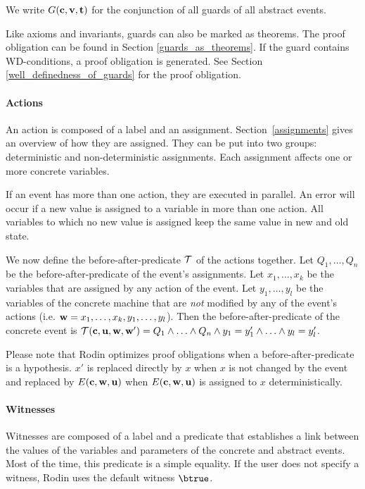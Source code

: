 We write $G(\mathbf{c},\mathbf{v},\mathbf{t})$ for the conjunction of all guards of all abstract events.

Like axioms and invariants, guards can also be marked as theorems. 
The proof obligation can be found in Section \ref{guards_as_theorems}.
If the guard contains WD-conditions, a proof obligation is generated.
See Section \ref{well_definedness_of_guards} for the proof obligation.

\paragraph{Actions}
\label{actions}
An action is composed of a label and an assignment.
Section~\ref{assignments} gives an overview of how they are assigned.
They can be put into two groups: deterministic and non-deterministic assignments.
Each assignment affects one or more concrete variables.

If an event has more than one action, they are executed in parallel. 
An error will occur if a new value is assigned to a variable in more than one action.
All variables to which no new value is assigned keep the same value in new and old state.

We now define the before-after-predicate $\mathcal{T}$ of the actions together.
Let $Q_1,\ldots,Q_n$ be the before-after-predicate of the event's assignments. 
Let $x_1,\ldots,x_k$ be the variables that are assigned by any action of the event.
Let $y_1,\ldots,y_l$ be the variables of the concrete machine that are \emph{not} modified by any of 
 the event's actions (i.e. $\mathbf{w} = x_1,\ldots,x_k,y_1,\ldots,y_l$).
Then the before-after-predicate of the concrete event is 
  $\mathcal{T}(\mathbf{c},\mathbf{u},\mathbf{w},\mathbf{w}') = Q_1 \land \ldots \land Q_n \land y_1 = y_1' \land \ldots \land y_l=y_l'$.

Please note that Rodin optimizes proof obligations when a before-after-predicate is a hypothesis.
$x'$ is replaced directly by $x$ when $x$ is not changed by the event and replaced by $E(\mathbf{c},\mathbf{w},\mathbf{u})$
 when $E(\mathbf{c},\mathbf{w},\mathbf{u})$ is assigned to $x$ deterministically.

\paragraph{Witnesses}
\label{witness}

Witnesses are composed of a label and a predicate that establishes a link between the values 
  of the variables and parameters of the concrete and abstract events.
Most of the time, this predicate is a simple equality.
If the user does not specify a witness, Rodin uses the default witness $\btrue$.


